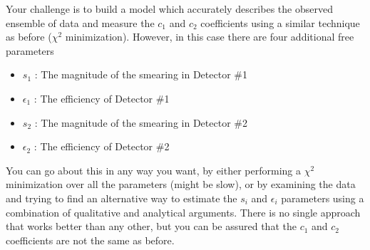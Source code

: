 \documentclass[12pt]{article}
\begin{document}
Your challenge is to build a model which accurately describes the observed ensemble of data and measure the $c_1$ and $c_2$ coefficients using a similar technique as before ($\chi^2$ minimization).  However, in this case there are four additional free parameters
\begin{itemize}[noitemsep]
\item $s_{1}$ : The magnitude of the smearing in Detector \#1
\item $\epsilon_1$ : The efficiency of Detector \#1
\item $s_{2}$ : The magnitude of the smearing in Detector \#2
\item $\epsilon_2$ : The efficiency of Detector \#2
\end{itemize}
You can go about this in any way you want, by either performing a $\chi^2$ minimization over all the parameters (might be slow), or by examining the data and trying to find an alternative way to estimate the $s_i$ and $\epsilon_i$ parameters using a combination of qualitative and analytical arguments.  There is no single approach that works better than any other, but you can be assured that the $c_1$ and $c_2$ coefficients are not the same as before.
\end{document}
